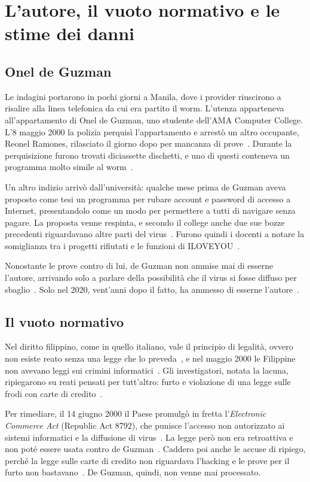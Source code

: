 \section{L'autore, il vuoto normativo e le stime dei danni}\label{sec:Autore}
\subsection{Onel de Guzman}\label{subsec:deGuzman}
Le indagini portarono in pochi giorni a Manila, dove i provider riuscirono a risalire alla linea telefonica da cui era partito il worm.
L'utenza apparteneva all'appartamento di Onel de Guzman, uno studente dell'AMA Computer College.
L'8 maggio 2000 la polizia perquisì l'appartamento e arrestò un altro occupante, Reonel Ramones, rilasciato il giorno dopo per mancanza di prove~\cite{wired2000freed}.
Durante la perquisizione furono trovati diciassette dischetti, e uno di questi conteneva un programma molto simile al worm~\cite{ecommercetimes2000a}.

Un altro indizio arrivò dall'università: qualche mese prima de Guzman aveva proposto come tesi un programma per rubare account e password di accesso a Internet, presentandolo come un modo per permettere a tutti di navigare senza pagare.
La proposta venne respinta, e secondo il college anche due sue bozze precedenti riguardavano altre parti del virus~\cite{outlaw2000}.
Furono quindi i docenti a notare la somiglianza tra i progetti rifiutati e le funzioni di ILOVEYOU~\cite{cbs2000}.

Nonostante le prove contro di lui, de Guzman non ammise mai di esserne l'autore, arrivando solo a parlare della possibilità che il virus si fosse diffuso per sbaglio~\cite{outlaw2000}.
Solo nel 2020, vent'anni dopo il fatto, ha ammesso di esserne l'autore~\cite{bbc2020}.

\subsection{Il vuoto normativo}\label{subsec:vuotoNormativo}
Nel diritto filippino, come in quello italiano, vale il principio di legalità, ovvero non esiste reato senza una legge che lo preveda~\cite[pp.~34--35]{malibiran}, e nel maggio 2000 le Filippine non avevano leggi sui crimini informatici~\cite{deseret2000}.
Gli investigatori, notata la lacuna, ripiegarono su reati pensati per tutt'altro: furto e violazione di una legge sulle frodi con carte di credito~\cite{deseret2000}.

Per rimediare, il 14 giugno 2000 il Paese promulgò in fretta l'\emph{Electronic Commerce Act} (Republic Act 8792), che punisce l'accesso non autorizzato ai sistemi informatici e la diffusione di virus~\cite[p.~651]{sy2015}\cite{ecommercetimes2000a}.
La legge però non era retroattiva e non poté essere usata contro de Guzman~\cite{deseret2000}.
Caddero poi anche le accuse di ripiego, perché la legge sulle carte di credito non riguardava l'hacking e le prove per il furto non bastavano~\cite{deseret2000}.
De Guzman, quindi, non venne mai processato.

